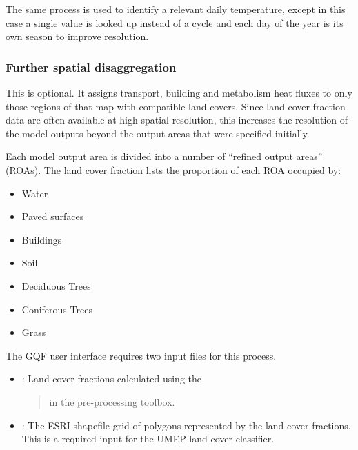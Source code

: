 \documentclass[letterpaper,10pt,english]{sphinxmanual}
\begin{document}
The same process is used to identify a relevant daily temperature,
except in this case a single value is looked up instead of a cycle and
each day of the year is its own season to improve resolution.


\subsubsection{Further spatial disaggregation}
\label{\detokenize{OtherManuals/LQF_Manual:further-spatial-disaggregation}}
This is optional. It assigns transport, building and metabolism heat
fluxes to only those regions of that map with compatible land covers.
Since land cover fraction data are often available at high spatial
resolution, this increases the resolution of the model outputs beyond
the output areas that were specified initially.

Each model output area is divided into a number of “refined output
areas” (ROAs). The land cover fraction lists the proportion of each ROA
occupied by:
\begin{itemize}
\item {} 
Water

\item {} 
Paved surfaces

\item {} 
Buildings

\item {} 
Soil

\item {} 
Deciduous Trees

\item {} 
Coniferous Trees

\item {} 
Grass

\end{itemize}

The GQF user interface requires two input files for this process.
\begin{itemize}
\item {} 
: Land cover fractions calculated using the
{\hyperref[\detokenize{pre-processor/Urban Land Cover Land Cover Reclassifier:landcoverreclassifier}]{}}
\begin{quote}

in the pre-processing toolbox.
\end{quote}

\item {} 
: The ESRI shapefile grid of polygons
represented by the land cover fractions. This is a required input for
the UMEP land cover classifier.

\end{itemize}
\end{document}
